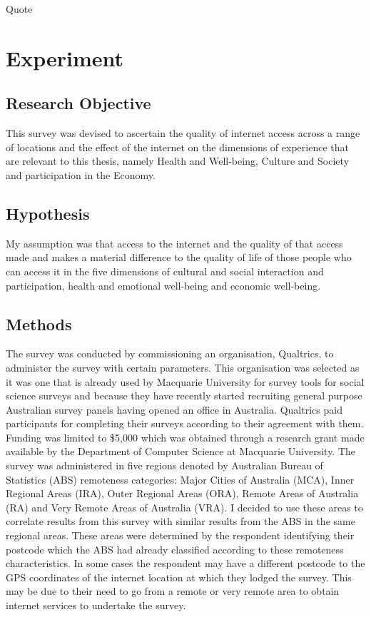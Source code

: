 \begin{savequote}[10cm] %
\sffamily
Quote

\end{savequote}

\chapter{Experiment}





\section{Research Objective}
This survey was devised to ascertain the quality of internet access across a range of locations and the effect of the internet on the dimensions of experience that are relevant to this thesis, namely Health and Well-being, Culture and Society and participation in the Economy. 
\section{Hypothesis}
My assumption was that access to the internet and the quality of that access made and makes a material difference to the quality of life of those people who can access it in the five dimensions of cultural and social interaction and participation, health and emotional well-being and economic well-being.
\section{Methods}
The survey was conducted by commissioning an organisation,  Qualtrics, to administer the survey with certain parameters. This organisation was selected as it was one that is already used by Macquarie University for survey tools for social science surveys and because they have recently started recruiting general purpose Australian survey panels having opened an office in Australia. Qualtrics paid participants for completing their surveys according to their agreement with them. Funding was limited to \$5,000 which was obtained through a research grant made available by the Department of Computer Science at Macquarie University. The survey was administered in five regions denoted by Australian Bureau of Statistics (ABS) remoteness categories: Major Cities of Australia (MCA), Inner Regional Areas (IRA), Outer Regional Areas (ORA), Remote Areas of Australia (RA) and Very Remote Areas of Australia (VRA). I decided to use these areas to correlate results from this survey with similar results from the ABS in the same regional areas. These areas were determined by the respondent identifying their postcode which the ABS had already classified according to these remoteness characteristics. In some cases the respondent may have a different postcode to the GPS coordinates of the internet location at which they lodged the survey. This may be due to their need to go from a remote or very remote area to obtain internet services to undertake the survey.

